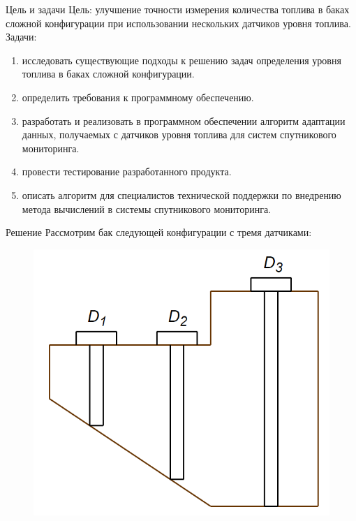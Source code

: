\documentclass[usenames,dvipsnames,11pt]{beamer}
\begin{document}
\begin{frame}{Цель и задачи}
	Цель: улучшение точности измерения количества топлива в баках сложной конфигурации при использовании нескольких датчиков уровня топлива.
	\bigbreak 
	Задачи:
	\begin{enumerate}
		\item исследовать существующие подходы к решению задач определения уровня топлива в баках сложной конфигурации.
		\item определить требования к программному обеспечению.
		\item разработать и реализовать в программном обеспечении алгоритм адаптации данных, получаемых с датчиков уровня топлива для систем спутникового мониторинга.
		\item провести тестирование разработанного продукта.
		\item описать алгоритм для специалистов технической поддержки по внедрению метода вычислений в системы спутникового мониторинга.			
	\end{enumerate}
\end{frame}	

\begin{frame}{Решение}
	Рассмотрим бак следующей конфигурации с тремя датчиками:
	\begin{figure}
		\centering
		\includegraphics[width=0.6\linewidth]{graphics/screenshot005}
	\end{figure}
\end{frame}	
\end{document}
